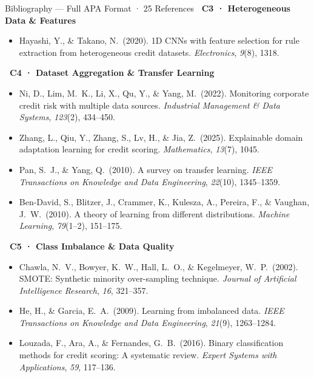 \documentclass[9pt,aspectratio=169]{beamer}
\begin{document}
\begin{frame}[allowframebreaks]{Bibliography \textnormal{\footnotesize --- Full APA Format · 25 References}}
\noindent\colorbox{yellow!50}{\scriptsize\textbf{~C3 · Heterogeneous Data \& Features~}}\\[2pt]
\begin{itemize}\setlength\itemsep{2pt}
  \item Hayashi, Y., \& Takano, N.\ (2020). 1D CNNs with feature selection for rule extraction from heterogeneous credit datasets. \textit{Electronics}, \textit{9}(8), 1318.
\end{itemize}\vspace{4pt}

\noindent\colorbox{forestgreen!25}{\scriptsize\textbf{~C4 · Dataset Aggregation \& Transfer Learning~}}\\[2pt]
\begin{itemize}\setlength\itemsep{2pt}
  \item Ni, D., Lim, M.\ K., Li, X., Qu, Y., \& Yang, M.\ (2022). Monitoring corporate credit risk with multiple data sources. \textit{Industrial Management \& Data Systems}, \textit{123}(2), 434--450.
  \item Zhang, L., Qiu, Y., Zhang, S., Lv, H., \& Jia, Z.\ (2025). Explainable domain adaptation learning for credit scoring. \textit{Mathematics}, \textit{13}(7), 1045.
  \item Pan, S.\ J., \& Yang, Q.\ (2010). A survey on transfer learning. \textit{IEEE Transactions on Knowledge and Data Engineering}, \textit{22}(10), 1345--1359.
  \item Ben-David, S., Blitzer, J., Crammer, K., Kulesza, A., Pereira, F., \& Vaughan, J.\ W.\ (2010). A theory of learning from different distributions. \textit{Machine Learning}, \textit{79}(1--2), 151--175.
\end{itemize}\vspace{4pt}

\noindent\colorbox{darkred!15}{\scriptsize\textbf{~C5 · Class Imbalance \& Data Quality~}}\\[2pt]
\begin{itemize}\setlength\itemsep{2pt}
  \item Chawla, N.\ V., Bowyer, K.\ W., Hall, L.\ O., \& Kegelmeyer, W.\ P.\ (2002). SMOTE: Synthetic minority over-sampling technique. \textit{Journal of Artificial Intelligence Research}, \textit{16}, 321--357.
  \item He, H., \& Garcia, E.\ A.\ (2009). Learning from imbalanced data. \textit{IEEE Transactions on Knowledge and Data Engineering}, \textit{21}(9), 1263--1284.
  \item Louzada, F., Ara, A., \& Fernandes, G.\ B.\ (2016). Binary classification methods for credit scoring: A systematic review. \textit{Expert Systems with Applications}, \textit{59}, 117--136.
\end{itemize}\vspace{4pt}


\end{frame}
\end{document}
